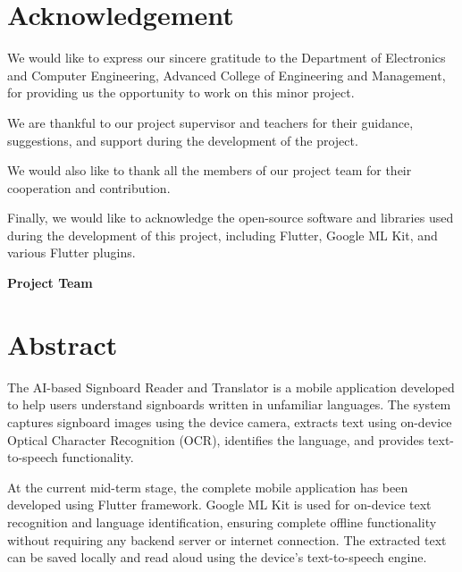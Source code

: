 \documentclass[12pt,a4paper]{report}
\begin{document}

\chapter*{Acknowledgement}

We would like to express our sincere gratitude to the Department of Electronics and Computer Engineering, Advanced College of Engineering and Management, for providing us the opportunity to work on this minor project.

We are thankful to our project supervisor and teachers for their guidance, suggestions, and support during the development of the project.

We would also like to thank all the members of our project team for their cooperation and contribution.

Finally, we would like to acknowledge the open-source software and libraries used during the development of this project, including Flutter, Google ML Kit, and various Flutter plugins.

\vspace{1cm}

\begin{flushright}
\textbf{Project Team}
\end{flushright}


\chapter*{Abstract}

The AI-based Signboard Reader and Translator is a mobile application developed to help users understand signboards written in unfamiliar languages. The system captures signboard images using the device camera, extracts text using on-device Optical Character Recognition (OCR), identifies the language, and provides text-to-speech functionality.

At the current mid-term stage, the complete mobile application has been developed using Flutter framework. Google ML Kit is used for on-device text recognition and language identification, ensuring complete offline functionality without requiring any backend server or internet connection. The extracted text can be saved locally and read aloud using the device's text-to-speech engine.
\end{document}
